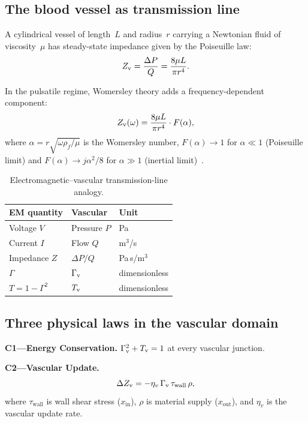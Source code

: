\documentclass[aps,pre,twocolumn,superscriptaddress,floatfix]{revtex4-2}
\begin{document}
\subsection{The blood vessel as transmission line}

A cylindrical vessel of length~$L$ and radius~$r$
carrying a Newtonian fluid of viscosity~$\mu$ has
steady-state impedance given by the Poiseuille law:
\begin{equation}
  Z_{\text{v}} = \frac{\Delta P}{Q} = \frac{8\mu L}{\pi r^4}.
  \label{eq:poiseuille}
\end{equation}

In the pulsatile regime, Womersley theory adds
a frequency-dependent component:
\begin{equation}
  Z_{\text{v}}(\omega) = \frac{8\mu L}{\pi r^4}
    \cdot F(\alpha),
  \label{eq:womersley}
\end{equation}
where $\alpha = r\sqrt{\omega\rho_f/\mu}$ is the
Womersley number, $F(\alpha) \to 1$ for
$\alpha \ll 1$ (Poiseuille limit) and
$F(\alpha) \to j\alpha^2/8$ for $\alpha \gg 1$
(inertial limit)~\cite{womersley1955}.

\begin{table}[H]
\caption{Electromagnetic--vascular transmission-line
analogy.}
\label{tab:TL}
\begin{ruledtabular}
\begin{tabular}{lll}
\textbf{EM quantity} & \textbf{Vascular} & \textbf{Unit} \\
\hline
Voltage $V$    & Pressure $P$   & Pa     \\
Current $I$    & Flow $Q$       & m$^3$/s \\
Impedance $Z$  & $\Delta P/Q$   & Pa\,s/m$^3$ \\
$\Gamma$       & $\Gamma_{\text{v}}$          & dimensionless \\
$T = 1-\Gamma^2$ & $T_{\text{v}}$       & dimensionless \\
\end{tabular}
\end{ruledtabular}
\end{table}

\subsection{Three physical laws in the vascular domain}
\label{sec:vascular-laws}

\textbf{C1---Energy Conservation.}
$\Gamma_{\text{v}}^2 + T_{\text{v}} = 1$ at every vascular junction.

\textbf{C2---Vascular Update.}
\begin{equation}
  \Delta Z_{\text{v}} = -\eta_v\,\Gamma_{\text{v}}\,\tau_{\text{wall}}\,\rho,
  \label{eq:C2v}
\end{equation}
where $\tau_{\text{wall}}$ is wall shear stress
($x_{\text{in}}$), $\rho$ is material supply
($x_{\text{out}}$), and $\eta_v$ is the vascular
update rate.
\end{document}
